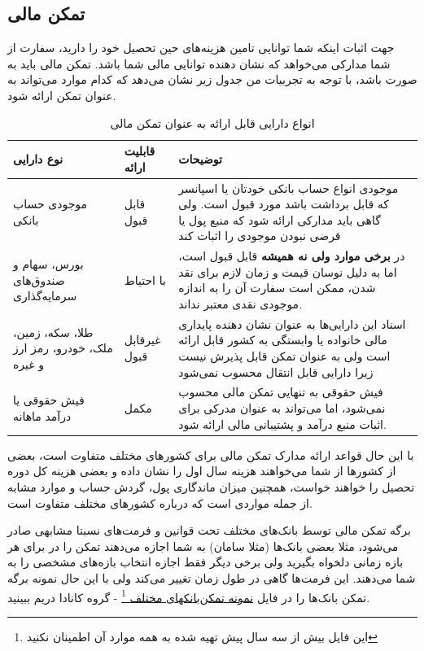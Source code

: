 \subsection{تمکن مالی}
جهت اثبات اینکه شما توانایی تامین هزینه‌های حین تحصیل خود را دارید، سفارت از شما مدارکی می‌خواهد که نشان دهنده توانایی مالی شما باشد. 
تمکن مالی باید به صورت  باشد، با توجه به تجربیات من جدول زیر نشان می‌دهد که کدام موارد می‌تواند به عنوان
تمکن ارائه شود. 
\begin{table}[h]
\centering
\caption{انواع دارایی قابل ارائه به عنوان تمکن مالی}
\label{tab:financial-capability}
\begin{tabular}{|p{4cm}|p{3cm}|p{7cm}|}
\hline
\textbf{نوع دارایی} & \textbf{قابلیت ارائه} & \textbf{توضیحات} \\
\hline
موجودی حساب بانکی & قابل قبول & موجودی انواع حساب بانکی خودتان یا اسپانسر که قابل برداشت باشد مورد قبول است. ولی گاهی باید مدارکی ارائه شود که منبع پول یا قرضی نبودن موجودی را اثبات کند \\
\hline
بورس، سهام و صندوق‌های سرمایه‌گذاری & با احتیاط & در \textbf{برخی موارد ولی نه همیشه} قابل قبول است، اما به دلیل نوسان قیمت و زمان لازم برای نقد شدن، ممکن است سفارت آن را به اندازه موجودی نقدی معتبر نداند. \\
\hline
طلا، سکه، زمین، ملک، خودرو، رمز ارز و غیره & غیرقابل قبول & اسناد این دارایی‌ها به عنوان نشان دهنده پایداری مالی خانواده یا وابستگی به کشور قابل ارائه است ولی به عنوان تمکن قابل پذیرش نیست زیرا دارایی قابل انتقال محسوب نمی‌شود \\
\hline
فیش حقوقی یا درآمد ماهانه & مکمل & فیش حقوقی به تنهایی تمکن مالی محسوب نمی‌شود، اما می‌تواند به عنوان مدرکی برای اثبات منبع درآمد و پشتیبانی مالی ارائه شود. \\
\hline
\end{tabular}
\end{table}

با این حال قواعد ارائه مدارک تمکن مالی برای کشور‌های مختلف متفاوت است، بعضی از کشور‌ها از شما می‌خواهند هزینه سال اول را نشان داده 
و بعضی هزینه کل دوره تحصیل را خواهند خواست، همچنین میزان ماندگاری پول، گردش حساب و موارد مشابه از جمله مواردی است که درباره 
کشور‌های مختلف متفاوت است.

\begin{tipbox}
    برگه تمکن مالی توسط بانک‌های مختلف تحت قوانین و فرمت‌های نسبتا مشابهی صادر می‌شود، مثلا بعضی بانک‌ها (مثلا سامان) به شما
    اجازه می‌دهند تمکن را در برای هر بازه زمانی دلخواه بگیرید ولی برخی دیگر فقط اجازه انتخاب بازه‌های مشخصی را به شما می‌دهند. 
    این فرمت‌ها گاهی در طول زمان تغییر می‌کند ولی با این حال نمونه برگه تمکن بانک‌ها را در فایل 
    \href{https://github.com/farbodbj/ApplyWay/blob/master/assets/tamakon-example.pdf}{نمونه تمکن‌بانکهای مختلف \footnote{این فایل بیش از سه سال پیش تهیه شده به همه موارد آن اطمینان نکنید} - گروه کانادا دریم}
    ببینید.
\end{tipbox}


